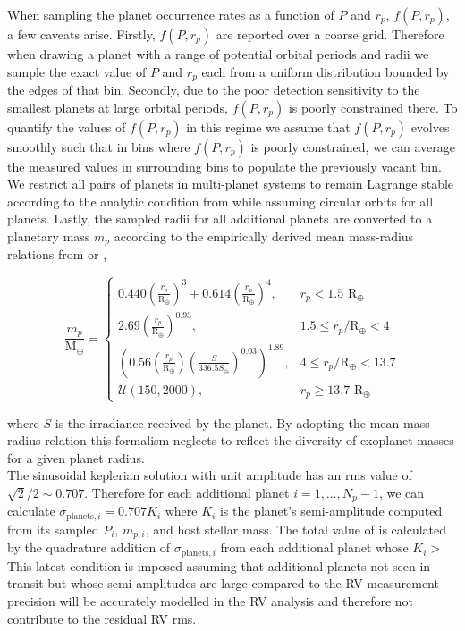 When sampling the planet occurrence rates as a function of $P$ and $r_p$, $f(P,r_p)$, a few caveats arise. Firstly,
$f(P,r_p)$ are reported over a coarse grid. Therefore when drawing a planet with a range of potential orbital
periods and radii we sample the exact value of $P$ and $r_p$ each from a uniform distribution bounded by the edges
of that bin. Secondly, due to the poor detection sensitivity to the smallest planets at large orbital periods,
$f(P,r_p)$ is poorly constrained there. To quantify the values of $f(P,r_p)$ in this regime we assume that
$f(P,r_p)$ evolves smoothly such that in bins where $f(P,r_p)$ is poorly constrained, we can average the measured
values in surrounding bins to populate the previously vacant bin. We restrict all pairs of planets in multi-planet
systems to remain Lagrange stable according to the analytic condition from \cite{barnes06} while assuming circular
orbits for all planets. Lastly, the sampled radii for all additional planets are converted to a planetary mass
$m_p$ according to the empirically derived mean mass-radius relations from \cite{weiss13} or \cite{weiss14},

\begin{equation}
  \frac{m_p}{\text{M}_{\oplus}} = 
  \begin{cases}
    0.440 \left(\frac{r_p}{\text{R}_{\oplus}} \right)^3 + 0.614 \left( \frac{r_p}{\text{R}_{\oplus}} \right)^4, & r_p < 1.5 \text{ R}_{\oplus} \\
    2.69 \left( \frac{r_p}{\text{R}_{\oplus}} \right)^{0.93}, & 1.5 \leq r_p/\text{R}_{\oplus} < 4 \\
    \left( 0.56 \left( \frac{r_p}{\text{R}_{\oplus}} \right) \left( \frac{S}{336.5 S_{\oplus}} \right)^{0.03} \right)^{1.89}, & 4 \leq r_p/\text{R}_{\oplus} < 13.7 \\  
    \mathcal{U}(150,2000), & r_p \geq 13.7 \text{ R}_{\oplus}
  \end{cases}
  \label{RVFCeq:MR}
\end{equation}

\noindent where $S$ is the irradiance received by the planet. By adopting the mean mass-radius relation this
formalism neglects to reflect the diversity of exoplanet masses for a given planet radius.   \\

The sinusoidal keplerian solution with unit amplitude has an rms value of $\sqrt{2}/2 \sim 0.707$.
Therefore for each additional planet $i=1,\dots,N_p-1$,
we can calculate $\sigma_{\text{planets},i}=0.707K_i$ where $K_i$ is the planet's semi-amplitude computed
from its sampled $P_i$, $m_{p,i}$, and host stellar mass.
The total value of \sigplan{}
is calculated by the quadrature addition of $\sigma_{\text{planets},i}$ from each additional planet whose
$K_i >$  This latest condition is imposed assuming that additional planets not seen in-transit
but whose semi-amplitudes are large compared to the RV measurement precision will be accurately
modelled in the RV analysis and therefore not contribute to the residual RV rms.

